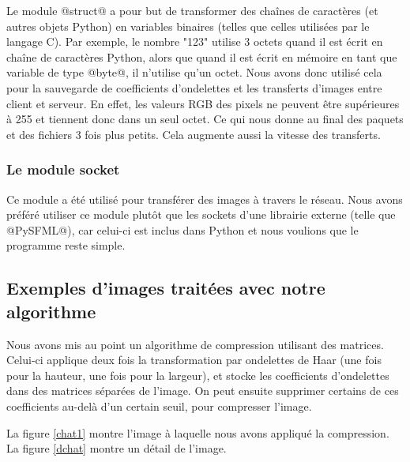\documentclass{article}
\begin{document}
Le module @struct@ a pour but de transformer des chaînes de caractères (et autres objets Python) en variables binaires (telles que celles utilisées par le langage C). Par exemple, le nombre "123" utilise 3 octets quand il est écrit en chaîne de caractères Python, alors que quand il est écrit en mémoire en tant que variable de type @byte@, il n'utilise qu'un octet. Nous avons donc utilisé cela pour la sauvegarde de coefficients d'ondelettes et les transferts d'images entre client et serveur. En effet, les valeurs RGB des pixels ne peuvent être supérieures à 255 et tiennent donc dans un seul octet. Ce qui nous donne au final des paquets et des fichiers 3 fois plus petits. Cela augmente aussi la vitesse des transferts.


\subsubsection{Le module socket}

Ce module a été utilisé pour transférer des images à travers le réseau. Nous avons préféré utiliser ce module plutôt que les sockets d'une librairie externe (telle que @PySFML@), car celui-ci est inclus dans Python et nous voulions que le programme reste simple.

\subsection{Exemples d'images traitées avec notre algorithme}

Nous avons mis au point un algorithme de compression utilisant des matrices. Celui-ci applique deux fois la transformation par ondelettes de Haar (une fois pour la hauteur, une fois pour la largeur), et stocke les coefficients d'ondelettes dans des matrices séparées de l'image. On peut ensuite supprimer certains de ces coefficients au-delà d'un certain seuil, pour compresser l'image.

La figure \ref{chat1} montre l'image à laquelle nous avons appliqué la compression. La figure \ref{dchat} montre un détail de l'image.
\end{document}
